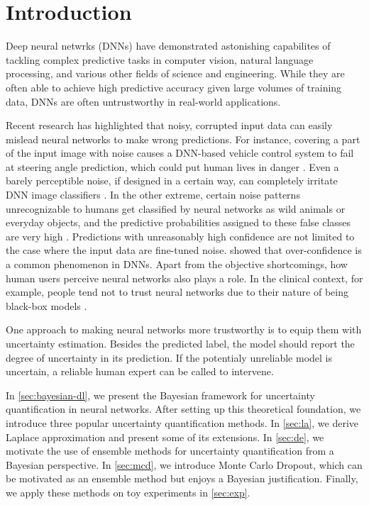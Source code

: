 \section{Introduction}
\label{sec:intro}

Deep neural netwrks (DNNs) have demonstrated astonishing capabilites of tackling complex predictive tasks in computer vision, natural language processing, and various other fields of science and engineering. While they are often able to achieve high predictive accuracy given large volumes of training data, DNNs are often untrustworthy in real-world applications.

Recent research has highlighted that noisy, corrupted input data can easily mislead neural networks to make wrong predictions. For instance, covering a part of the input image with noise causes a DNN-based vehicle control system to fail at steering angle prediction, which could put human lives in danger \citep{loquercioAutoDrive2020}. Even a barely perceptible noise, if designed in a certain way, can completely irritate DNN image classifiers \citep{moosaviAdversarial2017}. In the other extreme, certain noise patterns unrecognizable to humans get classified by neural networks as wild animals or everyday objects, and the predictive probabilities assigned to these false classes are very high \citep{nguyenFoolingDNN2015}. Predictions with unreasonably high confidence are not limited to the case where the input data are fine-tuned noise. \cite{guoCalibration2017} showed that over-confidence is a common phenomenon in DNNs. Apart from the objective shortcomings, how human users perceive neural networks also plays a role. In the clinical context, for example, people tend not to trust neural networks due to their nature of being black-box models \citep{royBrainSegment2019}.

One approach to making neural networks more trustworthy is to equip them with uncertainty estimation. Besides the predicted label, the model should report the degree of uncertainty in its prediction. If the potentialy unreliable model is uncertain, a reliable human expert can be called to intervene.

In \cref{sec:bayesian-dl}, we present the Bayesian framework for uncertainty quantification in neural networks. After setting up this theoretical foundation, we introduce three popular uncertainty quantification methods. In \cref{sec:la}, we derive Laplace approximation and present some of its extensions. In \cref{sec:de}, we motivate the use of ensemble methods for uncertainty quantification from a Bayesian perspective. In \cref{sec:mcd}, we introduce Monte Carlo Dropout, which can be motivated as an ensemble method but enjoys a Bayesian justification. Finally, we apply these methods on toy experiments in \cref{sec:exp}.
